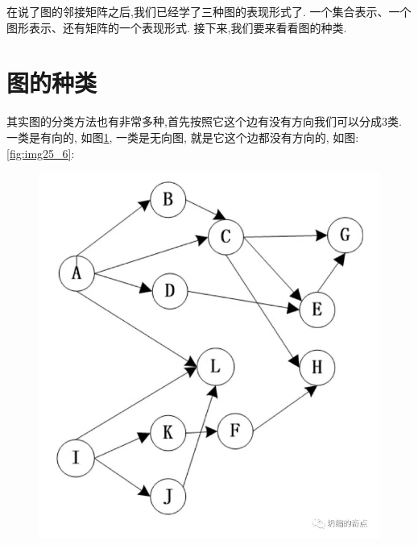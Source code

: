 在说了图的邻接矩阵之后,我们已经学了三种图的表现形式了. 一个集合表示、一个图形表示、还有矩阵的一个表现形式. 接下来,我们要来看看图的种类. 

\section{图的种类}

其实图的分类方法也有非常多种,首先按照它这个边有没有方向我们可以分成3类. 一类是有向的, 如图\ref{fig:img25_5}, 一类是无向图, 就是它这个边都没有方向的, 如图:\ref{fig:img25_6}: 

\begin{figure}[ht]
  \centering
  \begin{minipage}[h]{0.4\textwidth}
    \includegraphics[width=\textwidth]{asset/20231227145133.png}
    \caption{}
    \label{fig:img25_5}
  \end{minipage}%
  \hspace{1em}
  \begin{minipage}[h]{0.4\textwidth}

\end{minipage}
\end{figure}
